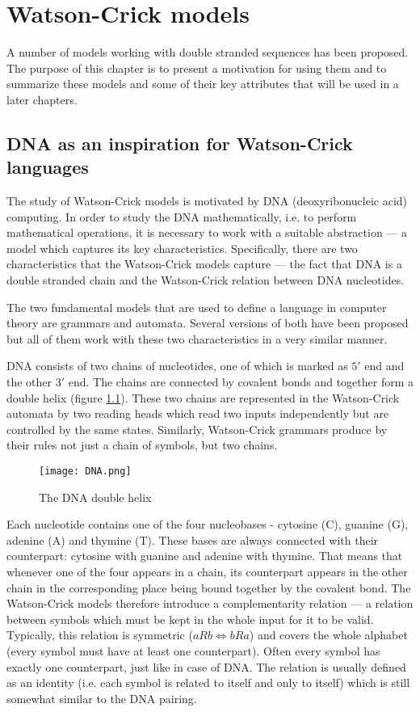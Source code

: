 \chapter{Watson-Crick models} \label{chapter:models}
A number of models working with double stranded sequences has been proposed. The purpose of this chapter is to present a motivation for using them and to summarize these models and some of their key attributes that will be used in a later chapters.

\section{DNA as an inspiration for Watson-Crick languages}
The study of Watson-Crick models is motivated by DNA (deoxyribonucleic acid) computing. In order to study the DNA mathematically, i.e. to perform mathematical operations, it is necessary to work with a suitable abstraction --- a model which captures its key characteristics. Specifically, there are two characteristics that the Watson-Crick models capture --- the fact that DNA is a double stranded chain and the Watson-Crick relation between DNA nucleotides.

The two fundamental models that are used to define a language in computer theory are grammars and automata. Several versions of both have been proposed but all of them work with these two characteristics in a very similar manner.

DNA consists of two chains of nucleotides, one of which is marked as $5'$ end and the other $3'$ end. The chains are connected by covalent bonds and together form a double helix (figure \ref{fig:dna}). These two chains are represented in the Watson-Crick automata by two reading heads which read two inputs independently but are controlled by the same states. Similarly, Watson-Crick grammars produce by their rules not just a chain of symbols, but two chains.

\begin{figure}[ht]
  \texttt{[image: DNA.png]}
  \centering
  \label{fig:dna}
  \caption{The DNA double helix}
\end{figure}

Each nucleotide contains one of the four nucleobases - cytosine (C), guanine (G), adenine (A) and thymine (T). These bases are always connected with their counterpart: cytosine with guanine and adenine with thymine. That means that whenever one of the four appears in a chain, its counterpart appears in the other chain in the corresponding place being bound together by the covalent bond. The Watson-Crick models therefore introduce a complementarity relation --- a relation between symbols which must be kept in the whole input for it to be valid. Typically, this relation is symmetric ($a R b \Leftrightarrow b R a$) and covers the whole alphabet (every symbol must have at least one counterpart). Often every symbol has exactly one counterpart, just like in case of DNA. The relation is usually defined as an identity (i.e. each symbol is related to itself and only to itself) which is still somewhat similar to the DNA pairing.


